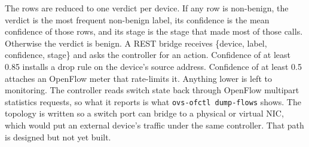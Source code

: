 The rows are reduced to one verdict per device. If any row is non-benign, the verdict is the most frequent non-benign label, its confidence is the mean confidence of those rows, and its stage is the stage that made most of those calls. Otherwise the verdict is benign. A REST bridge receives \{device, label, confidence, stage\} and asks the controller for an action. Confidence of at least 0.85 installs a drop rule on the device's source address. Confidence of at least 0.5 attaches an OpenFlow meter that rate-limits it. Anything lower is left to monitoring. The controller reads switch state back through OpenFlow multipart statistics requests, so what it reports is what \texttt{ovs-ofctl dump-flows} shows. The topology is written so a switch port can bridge to a physical or virtual NIC, which would put an external device's traffic under the same controller. That path is designed but not yet built.
